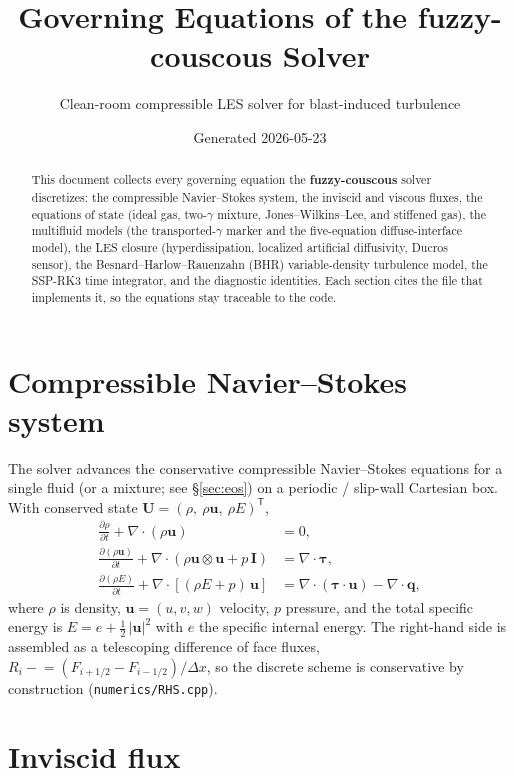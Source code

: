 \documentclass[11pt]{article}
\title{Governing Equations of the \textbf{fuzzy-couscous} Solver}
\author{Clean-room compressible LES solver for blast-induced turbulence}
\date{Generated 2026-05-23}
\newcommand{\dpar}[2]{\frac{\partial #1}{\partial #2}}
\newcommand{\uvec}{\mathbf{u}}
\newcommand{\code}[1]{\texttt{#1}}
\begin{document}
\maketitle

\begin{abstract}
This document collects every governing equation the \textbf{fuzzy-couscous}
solver discretizes: the compressible Navier--Stokes system, the inviscid and
viscous fluxes, the equations of state (ideal gas, two-$\gamma$ mixture,
Jones--Wilkins--Lee, and stiffened gas), the multifluid models (the
transported-$\gamma$ marker and the five-equation diffuse-interface model), the
LES closure
(hyperdissipation, localized artificial diffusivity, Ducros sensor), the
Besnard--Harlow--Rauenzahn (BHR) variable-density turbulence model, the SSP-RK3
time integrator, and the diagnostic identities. Each section cites the file that
implements it, so the equations stay traceable to the code.
\end{abstract}

\tableofcontents

\section{Compressible Navier--Stokes system}
\label{sec:ns}

The solver advances the conservative compressible Navier--Stokes equations for a
single fluid (or a mixture; see \S\ref{sec:eos}) on a periodic / slip-wall
Cartesian box. With conserved state
$\mathbf{U} = (\rho,\ \rho\uvec,\ \rho E)^{\mathsf T}$,
\begin{align}
\dpar{\rho}{t} + \nabla\!\cdot(\rho\uvec) &= 0, \\
\dpar{(\rho\uvec)}{t} + \nabla\!\cdot\!\left(\rho\uvec\otimes\uvec + p\,\mathbf{I}\right)
   &= \nabla\!\cdot\boldsymbol{\tau}, \\
\dpar{(\rho E)}{t} + \nabla\!\cdot\!\left[(\rho E + p)\,\uvec\right]
   &= \nabla\!\cdot(\boldsymbol{\tau}\cdot\uvec) - \nabla\!\cdot\mathbf{q},
\end{align}
where $\rho$ is density, $\uvec=(u,v,w)$ velocity, $p$ pressure, and the total
specific energy is $E = e + \tfrac12\,|\uvec|^2$ with $e$ the specific internal
energy. The right-hand side is assembled as a telescoping difference of face
fluxes, $R_i \mathrel{-}= (F_{i+1/2}-F_{i-1/2})/\Delta x$, so the discrete scheme
is conservative by construction (\code{numerics/RHS.cpp}).

\section{Inviscid flux}
\label{sec:euler}
\end{document}
